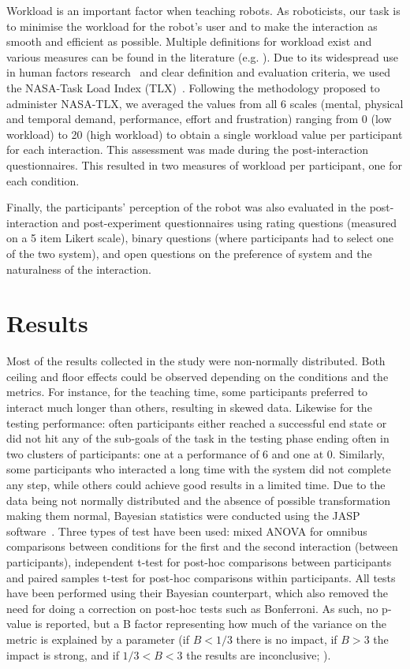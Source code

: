 Workload is an important factor when teaching robots. As roboticists, our task is to minimise the workload for the robot's user and to make the interaction as smooth and efficient as possible. Multiple definitions for workload exist and various measures can be found in the literature (e.g. \citealt{wierwille1983evaluation,moray2013mental}). Due to its widespread use in human factors research~\citep{hart2006nasa} and clear definition and evaluation criteria, we used the NASA-Task Load Index (TLX)~\citep{hart1988development}. Following the methodology proposed to administer NASA-TLX, we averaged the values from all 6 scales (mental, physical and temporal demand, performance, effort and frustration) ranging from 0 (low workload) to 20 (high workload) to obtain a single workload value per participant for each interaction. This assessment was made during the post-interaction questionnaires. This resulted in two measures of workload per participant, one for each condition.

Finally, the participants' perception of the robot was also evaluated in the post-interaction and post-experiment questionnaires using rating questions (measured on a 5 item Likert scale), binary questions (where participants had to select one of the two system), and open questions on the preference of system and the naturalness of the interaction. 

\section{Results}

Most of the results collected in the study were non-normally distributed. Both ceiling and floor effects could be observed depending on the conditions and the metrics. For instance, for the teaching time, some participants preferred to interact much longer than others, resulting in skewed data. Likewise for the testing performance: often participants either reached a successful end state or did not hit any of the sub-goals of the task in the testing phase ending often in two clusters of participants: one at a performance of 6 and one at 0.  Similarly, some participants who interacted a long time with the system did not complete any step, while others could achieve good results in a limited time. Due to the data being not normally distributed and the absence of possible transformation making them normal, Bayesian statistics were conducted using the JASP software~\citep{jasp2018}. Three types of test have been used: mixed ANOVA for omnibus comparisons between conditions for the first and the second interaction (between participants), independent t-test for post-hoc comparisons between participants and paired samples t-test for post-hoc comparisons within participants. All tests have been performed using their Bayesian counterpart, which also removed the need for doing a correction on post-hoc tests such as Bonferroni. As such, no p-value is reported, but a B factor representing how much of the variance on the metric is explained by a parameter (if $B < 1/3$ there is no impact, if $B > 3$ the impact is strong, and if $1/3<B<3$ the results are inconclusive; \citealt{jeffreys1998theory,dienes2011bayesian}).

